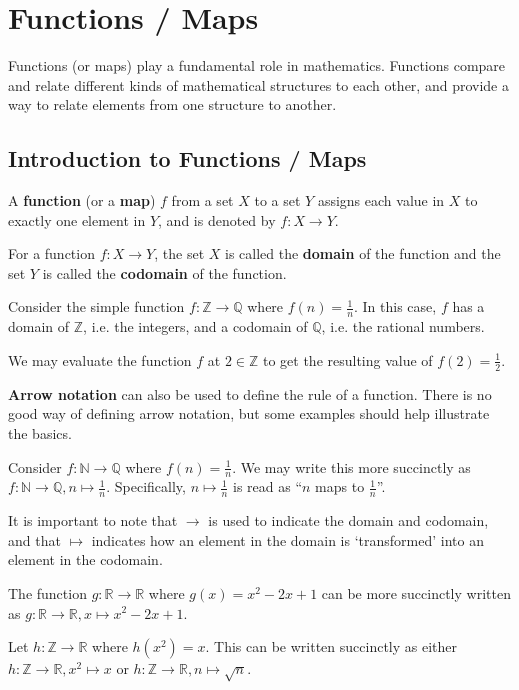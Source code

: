 \chapter{Functions / Maps}
Functions (or maps) play a fundamental role in mathematics. Functions compare and relate different kinds of mathematical structures to each other, and provide a way to relate elements from one structure to another.

\section{Introduction to Functions / Maps}
\begin{definition}
    A \textbf{function} (or a \textbf{map}) $f$ from a set $X$ to a set $Y$ assigns each value in $X$ to exactly one element in $Y$, and is denoted by $f: X \to Y$.
\end{definition}
\begin{definition}
    For a function $f: X \to Y$, the set $X$ is called the \textbf{domain} of the function and the set $Y$ is called the \textbf{codomain} of the function.
\end{definition}
\begin{example}
    Consider the simple function $f: \mathbb{Z} \to \mathbb{Q}$ where $f(n) = \frac1n$. In this case, $f$ has a domain of $\mathbb{Z}$, i.e. the integers, and a codomain of $\mathbb{Q}$, i.e. the rational numbers.

    We may evaluate the function $f$ at $2 \in \mathbb{Z}$ to get the resulting value of $f(2) = \frac12$.
\end{example}

\textbf{Arrow notation} can also be used to define the rule of a function. There is no good way of defining arrow notation, but some examples should help illustrate the basics.
\begin{example}
    Consider $f: \mathbb{N} \to \mathbb{Q}$ where $f(n) = \frac1n$. We may write this more succinctly as $f: \mathbb{N} \to \mathbb{Q}, n \mapsto \frac1n$. Specifically, $n \mapsto \frac1n$ is read as ``$n$ maps to $\frac1n$''.
    
    It is important to note that $\to$ is used to indicate the domain and codomain, and that $\mapsto$ indicates how an element in the domain is `transformed' into an element in the codomain.
\end{example}
\begin{example}
    The function $g: \mathbb{R} \to \mathbb{R}$ where $g(x) = x^2 - 2x + 1$ can be more succinctly written as $g: \mathbb{R} \to \mathbb{R}, x \mapsto x^2 - 2x + 1$.
\end{example}
\begin{example}
    Let $h: \mathbb{Z} \to \mathbb{R}$ where $h(x^2) = x$. This can be written succinctly as either $h: \mathbb{Z} \to \mathbb{R}, x^2 \mapsto x$ or $h: \mathbb{Z} \to \mathbb{R}, n \mapsto \sqrt n$.
\end{example}


